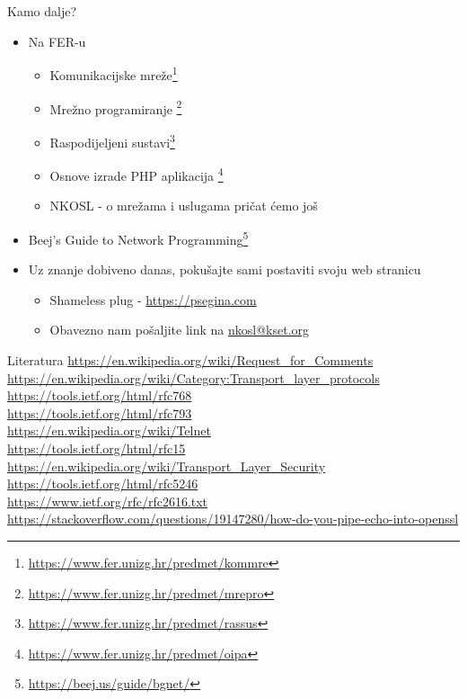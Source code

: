 \documentclass[t]{beamer}
\begin{document}
\section*{}

\begin{frame}{Kamo dalje?}
    \begin{itemize}
        \item Na FER-u
        \begin{itemize}
            \item Komunikacijske mreže\footnote{\url{https://www.fer.unizg.hr/predmet/kommre}}
            \item Mrežno programiranje \footnote{\url{https://www.fer.unizg.hr/predmet/mrepro}}
            \item Raspodijeljeni sustavi\footnote{\url{https://www.fer.unizg.hr/predmet/rassus}}
            \item Osnove izrade PHP aplikacija \footnote{\url{https://www.fer.unizg.hr/predmet/oipa}}
            \item NKOSL - o mrežama i uslugama pričat ćemo još
        \end{itemize}
        \item Beej's Guide to Network Programming\footnote{\url{https://beej.us/guide/bgnet/}}
        \item Uz znanje dobiveno danas, pokušajte sami postaviti svoju web stranicu
        \begin{itemize}
            \item Shameless plug - \url{https://psegina.com}
            \item Obavezno nam pošaljite link na 
            \href{mailto:nkosl@kset.org}{nkosl@kset.org}
        \end{itemize}
    \end{itemize}
\end{frame}

\begin{frame}{Literatura}
\url{https://en.wikipedia.org/wiki/Request_for_Comments}\\
\url{https://en.wikipedia.org/wiki/Category:Transport_layer_protocols}\\
\url{https://tools.ietf.org/html/rfc768}\\
\url{https://tools.ietf.org/html/rfc793}\\
\url{https://en.wikipedia.org/wiki/Telnet}\\
\url{https://tools.ietf.org/html/rfc15}\\
\url{https://en.wikipedia.org/wiki/Transport_Layer_Security}\\
\url{https://tools.ietf.org/html/rfc5246}\\
\url{https://www.ietf.org/rfc/rfc2616.txt}\\
\url{https://stackoverflow.com/questions/19147280/how-do-you-pipe-echo-into-openssl}
\end{frame}
\end{document}
